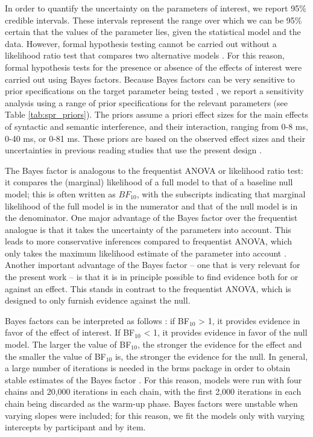 \documentclass[a4paper, man, floatsintext]{apa7}
\begin{document}
In order to quantify the uncertainty on the parameters of interest, we report 95\% credible intervals.  
These intervals represent the range over which we can be 95\% certain that the values of the parameter lies, given the statistical model and the data. However, formal hypothesis testing cannot be carried out without a likelihood ratio test that compares two alternative models \parencite{schad_etal_2022_BF,Royall}. For this reason, formal hypothesis tests for the presence or absence of the effects of interest were carried out using Bayes factors. Because Bayes factors can be very sensitive to prior specifications on the target parameter being tested \parencite{schad_etal_2022_BF}, 
we report a sensitivity analysis using a range of prior specifications for the relevant parameters (see Table \ref{tab:spr_priors}). The priors assume a priori effect sizes for the main effects of syntactic and semantic interference, and their interaction, ranging from 0-8 ms, 0-40 ms, or 0-81 ms.  These priors are based on the observed effect sizes and their uncertainties in previous reading studies that use the present design \parencite{vandyke07,mertzen}.

The Bayes factor is analogous to the frequentist ANOVA or likelihood ratio test: it compares the (marginal) likelihood of a full model to that of a baseline null model; this is often written as $BF_{10}$, with the subscripts indicating that marginal likelihood of the full model is in the numerator and that of the null model is in the denominator. One major advantage of the Bayes factor over the frequentist analogue is that it takes the uncertainty of the parameters into account. This leads to more conservative inferences compared to frequentist ANOVA, which only takes the maximum likelihood estimate of the parameter into account \parencite[see][for detailed discussion]{schad_etal_2022_BF}. Another important advantage of the Bayes factor -- one that is very relevant for the present work -- is that it is in principle possible to find evidence both for or against an effect. This stands in contrast to the frequentist ANOVA, which is designed to only furnish evidence against the null. 

Bayes factors can be interpreted as follows \parencite[e.g., ][]{lee2014bayesian}: if BF$_{10}$ > 1, it provides evidence in favor of the effect of interest. If BF$_{10}$ < 1, it provides evidence in favor of the null model. The larger the value of BF$_{10}$, the stronger the evidence for the effect and the smaller the value of BF$_{10}$ is, the stronger the evidence for the null. 
In general, a large number of iterations is needed in the brms package in order to obtain stable estimates of the Bayes factor  \citep{schad_etal_2022_BF}.
For this reason, models were run with four chains and 20,000 iterations in each chain, with the first 2,000 iterations in each chain being discarded as the warm-up phase.  Bayes factors were unstable when varying slopes were included; for this reason, we fit the models only with varying intercepts by participant and by item.
\end{document}
